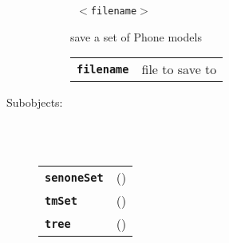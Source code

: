 \begin{description}
\begin{description}
       \texttt{ $<$filename$>$} \

        save a set of Phone models

      \begin{tabular}{ll}
 \texttt{\textbf{filename}} &  file to save to  \\
      \end{tabular}
    \end{description}

  \item[Subobjects:] \hfill \\
\ 
    \begin{tabular}{ll}
      \texttt{\textbf{senoneSet}} & (\Jref{module}{SenoneSet}) \\
      \texttt{\textbf{tmSet}} & (\Jref{module}{TmSet}) \\
      \texttt{\textbf{tree}} & (\Jref{module}{Tree}) \\
    \end{tabular}
\vspace{3mm}

\end{description}

